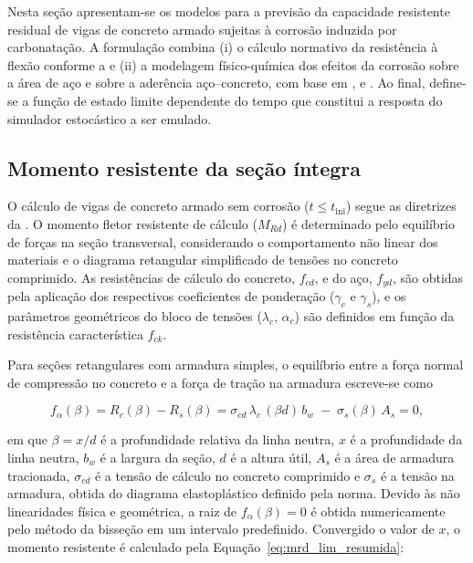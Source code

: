 
Nesta seção apresentam-se os modelos para a previsão da capacidade resistente residual de vigas de concreto armado sujeitas à corrosão induzida por carbonatação. A formulação combina (i) o cálculo normativo da resistência à flexão conforme a \citet{nbr6118} e (ii) a modelagem físico-química dos efeitos da corrosão sobre a área de aço e sobre a aderência aço--concreto, com base em \citet{azad2010}, \citet{val1997} e \citet{peng2016}. Ao final, define-se a função de estado limite dependente do tempo que constitui a resposta do simulador estocástico a ser emulado.

\subsection{Momento resistente da seção íntegra}
\label{subsec:mrd0}

O cálculo de vigas de concreto armado sem corrosão ($t \leq t_{\mathrm{ini}}$) segue as diretrizes da \citet{nbr6118}. O momento fletor resistente de cálculo ($M_{Rd}$) é determinado pelo equilíbrio de forças na seção transversal, considerando o comportamento não linear dos materiais e o diagrama retangular simplificado de tensões no concreto comprimido. As resistências de cálculo do concreto, $f_{cd}$, e do aço, $f_{yd}$, são obtidas pela aplicação dos respectivos coeficientes de ponderação ($\gamma_c$ e $\gamma_s$), e os parâmetros geométricos do bloco de tensões ($\lambda_c$, $\alpha_c$) são definidos em função da resistência característica $f_{ck}$.

Para seções retangulares com armadura simples, o equilíbrio entre a força normal de compressão no concreto e a força de tração na armadura escreve-se como

\begin{equation}\label{eq:equilibrio}
f_\alpha(\beta) = R_c(\beta) - R_s(\beta) = \sigma_{cd}\, \lambda_c\, (\beta d)\, b_w \;-\; \sigma_s(\beta)\, A_s = 0,
\end{equation}

\noindent em que $\beta = x/d$ é a profundidade relativa da linha neutra, $x$ é a profundidade da linha neutra, $b_w$ é a largura da seção, $d$ é a altura útil, $A_s$ é a área de armadura tracionada, $\sigma_{cd}$ é a tensão de cálculo no concreto comprimido e $\sigma_s$ é a tensão na armadura, obtida do diagrama elastoplástico definido pela norma. Devido às não linearidades física e geométrica, a raiz de $f_\alpha(\beta) = 0$ é obtida numericamente pelo método da bisseção em um intervalo predefinido. Convergido o valor de $x$, o momento resistente é calculado pela Equação~\eqref{eq:mrd_lim_resumida}:

